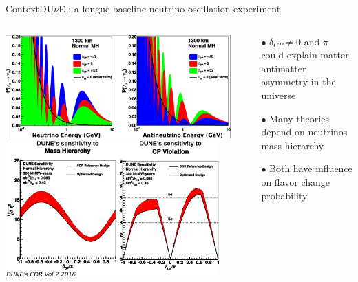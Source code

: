 \documentclass[10pt]{beamer}
\begin{document}
    \begin{frame}{Context}{DU$\nu$E : a longue baseline neutrino oscillation experiment}
    	\begin{columns}
    		\begin{column}{0.6\textwidth}
    			\centering
    			\includegraphics[width=\textwidth]{figures/contexte/oscillation_CP.png}\\\vspace{0.2cm}
    			 \includegraphics[width=0.95\textwidth]{figures/contexte/sensitivities.png}
    		\end{column}
    		\begin{column}{0.4\textwidth}
    			\begin{itemize}
	    			\item[$\bullet$]$\delta_{CP}\ne0$ and $\pi$ could explain matter-antimatter asymmetry in the universe\\
	    			\item[$\bullet$] Many theories depend on neutrinos mass hierarchy
	    			\item[$\bullet$] Both have influence on flavor change probability
	    		\end{itemize}
    			\begin{scriptsize}

\end{scriptsize}
\end{column}
\end{columns}
\end{frame}
\end{document}
